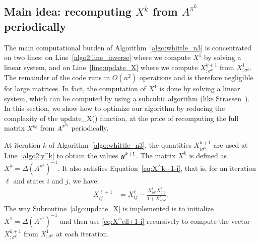 \documentclass[acmsmall,screen,anonymous]{acmart}
\begin{document}
\subsection{Main idea: recomputing $X^{k}$ from $A^{\pi^k}$ periodically}

The main computational burden of Algorithm~\ref{algo:whittle_n3} is concentrated on two lines: on Line~\ref{algo2:line_inverse} where we compute $X^1$ by solving a linear system, and on Line~\ref{line:update_X} where we compute $X^{k+1}_{\colon\sigma^{k}}$ from $X^1_{\colon \sigma^{k}}$. The remainder of the code runs in $O(n^2)$ operations and is therefore negligible for large matrices. In fact, the computation of $X^1$ is done by solving a linear system, which can be computed by using a subcubic algorithm (like Strassen~\cite{strassen1969gaussian}). In this section, we show how to optimize our algorithm by reducing the complexity of the update\_X() function, at the price of recomputing the full matrix $X^{k_0}$ from $A^{\pi^{k_0}}$ periodically.

At iteration $k$ of Algorithm~\ref{algo:whittle_n3}, the quantities $X^{k+1}_{i\sigma^{k}}$ are used at Line~\ref{algo2:y^k} to obtain the values $\boldsymbol{y}^{k+1}$. The matrix $X^k$ is defined as $X^k=\Delta(A^{\pi^k})^{-1}$. It also satisfies Equation~\eqref{eq:X^k+1-i}, that is, for an iteration $\ell$ and states $i$ and $j$, we have: 
\begin{align}
    \label{eq:X^ell+1-i}
    X^{\ell+1}_{ij} &= X^{\ell}_{ij} - \frac{X^{\ell}_{i\sigma^\ell} X^{\ell}_{{\sigma^\ell} j}}{1+X^{\ell}_{{\sigma^\ell\sigma^\ell}}}.
\end{align}
The way Subroutine~\ref{algo:update_X} is implemented is to initialize $X^1=\Delta(A^{\pi^1})^{-1}$ and then use \eqref{eq:X^ell+1-i} recursively to compute the vector $X^{k+1}_{\colon \sigma^{k}}$ from $X^1_{\colon \sigma^{k}}$ at each iteration.
\end{document}
